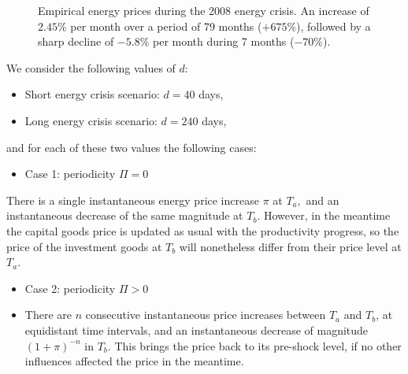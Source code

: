 \begin{figure}[ht!]
\centering\leavevmode
\begin{boxedminipage}{10.5cm}
\centering\leavevmode
{}
\end{boxedminipage}
\caption{Empirical energy prices during the 2008 energy crisis. An increase
of $2.45\%$ per month over a period of 79 months ($+675\%$), followed by a
sharp decline of $-5.8\%$ per month during 7 months ($-70\%$).}
\label{Figure: empirical energy shock}
\end{figure}

We consider the following values of $d$:
\begin{itemize}
\item Short energy crisis scenario: $d=40$ days,
\item Long energy crisis scenario: $d=240$ days,
\end{itemize}
and for each of these two values the following cases:

\begin{itemize}
\item Case 1: periodicity $\Pi=0$
\end{itemize}

There is a single instantaneous energy price increase $\pi$ at $T_{a},$ and
an instantaneous decrease of the same magnitude at $T_{b}.$ However, in the
meantime the capital goods price is updated as usual with the productivity
progress, so the price of the investment goods at $T_{b}$ will nonetheless
differ from their price level at $T_{a}$.

\begin{itemize}
\item Case 2: periodicity $\Pi>0$

\item There are $n$ consecutive instantaneous price increases between $T_{a}$
and $T_{b}$, at equidistant time intervals, and an instantaneous decrease
of magnitude $(1+\pi)^{-n}$ in $T_{b}$. This brings the price back to its pre-shock level, 
if no other influences affected the price in the meantime.
\end{itemize}

